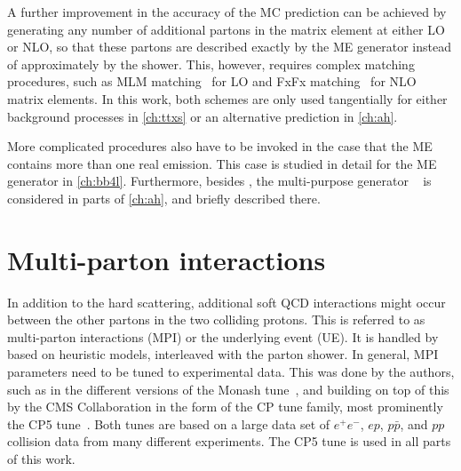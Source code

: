 A further improvement in the accuracy of the MC prediction can be achieved by generating any number of additional partons in the matrix element at either LO or NLO, so that these partons are described exactly by the ME generator instead of approximately by the shower. This, however, requires complex matching procedures, such as MLM matching~\cite{Mangano:2006rw} for LO and FxFx matching~\cite{Frederix:2012ps} for NLO matrix elements. In this work, both schemes are only used tangentially for either background processes in \cref{ch:ttxs} or an alternative \ttbar prediction in \cref{ch:ah}.

More complicated procedures also have to be invoked in the case that the ME contains more than one real emission. This case is studied in detail for the ME generator \bbfourl in \cref{ch:bb4l}. Furthermore, besides \pythia, the multi-purpose generator \herwig~\cite{Bellm:2015jjp,Bahr:2008pv} is considered in parts of \cref{ch:ah}, and briefly described there.




\section{Multi-parton interactions}
\label{sec:mc:mpi}

In addition to the hard scattering, additional soft QCD interactions might occur between the other partons in the two colliding protons. This is referred to as multi-parton interactions (MPI) or the underlying event (UE). It is handled by \pythia based on heuristic models, interleaved with the parton shower. In general, MPI parameters need to be tuned to experimental data. This was done by the \pythia authors, such as in the different versions of the Monash tune~\cite{Skands:2014pea}, and building on top of this by the CMS Collaboration in the form of the CP tune family, most prominently the CP5 tune~\cite{CMS:GEN-17-001}. Both tunes are based on a large data set of $e^+e^-$, $ep$, $p\bar{p}$, and $pp$ collision data from many different experiments. The CP5 tune is used in all parts of this work.

